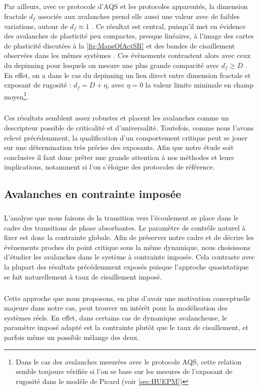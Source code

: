 \subparagraph{}Par ailleurs, avec ce protocole d'AQS et les protocoles apparentés, la dimension fractale $d_f$ associée aux avalanches prend elle aussi une valeur avec de faibles variations, autour de $d_f \approx 1$ \cite{liu_driving_2016, lin_scaling_2014, ferrero_criticality_2019}. Ce résultat est central, puisqu'il met en évidence des avalanches de plasticité peu compactes, presque linéaires, à l'image des cartes de plasticité discutées à la \autoref{fig:MapsOfActSR} et des bandes de cisaillement observées dans les mêmes systèmes \cite{martens_spontaneous_2012}. Ces évènements contrastent alors avec ceux du depinning pour lesquels on mesure une plus grande compacité avec $d_f \geq D$ \cite{wiese_theory_2022, le_priol_spatial_2021}. En effet, on a dans le cas du depinning un lien direct entre dimension fractale et exposant de rugosité : $d_f = D + \eta$, avec $\eta = 0$ la valeur limite minimale en champ moyen\footnote{Dans le cas des avalanches mesurées avec le protocole AQS, cette relation semble toujours vérifiée si l'on se base sur les mesures de l'exposant de rugosité dans le modèle de Picard (voir \autoref{sec:HUEPM})}.

\subparagraph{}Ces résultats semblent assez robustes et placent les avalanches comme un descripteur possible de criticalité et d'universalité. Toutefois, comme nous l'avons relevé précédemment, la qualification d'un comportement critique peut se jouer sur une détermination très précise des exposants. Afin que notre étude soit conclusive il faut donc prêter une grande attention à nos méthodes et leurs implications, notamment si l'on s'éloigne des protocoles de référence.

\subsection{Avalanches en contrainte imposée}

\subparagraph{}L'analyse que nous faisons de la transition vers l'écoulement se place dans le cadre des transitions de phase absorbantes. Le paramètre de contrôle naturel à fixer est donc la contrainte globale. Afin de préserver notre cadre et de décrire les évènements proches du point critique sous la même dynamique, nous choisissons d'étudier les avalanches dans le système à contrainte imposée. Cela contraste avec la plupart des résultats précédemment exposés puisque l'approche quasistatique se fait naturellement à taux de cisaillement imposé.

\subparagraph{}Cette approche que nous proposons, en plus d'avoir une motivation conceptuelle majeure dans notre cas, peut trouver un intérêt pour la modélisation des systèmes réels. En effet, dans certains cas de dynamique avalancheuse, le paramètre imposé adapté est la contrainte plutôt que le taux de cisaillement, et parfois même un possible mélange des deux.

